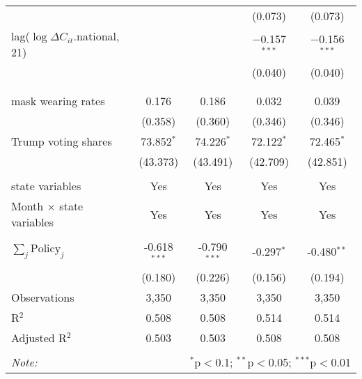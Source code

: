 \begin{tabular}{@{\extracolsep{1pt}}lcccc}
  &  &  & (0.073) & (0.073) \\ 
  lag($\log \Delta C_{it}$.national, 21) &  &  & $-$0.157$^{***}$ & $-$0.156$^{***}$ \\ 
  &  &  & (0.040) & (0.040) \\ 
   &  &  &  &  \\ 
  &  &  &  &  \\ 
  mask wearing rates & 0.176 & 0.186 & 0.032 & 0.039 \\ 
  & (0.358) & (0.360) & (0.346) & (0.346) \\ 
  Trump voting shares & 73.852$^{*}$ & 74.226$^{*}$ & 72.122$^{*}$ & 72.465$^{*}$ \\ 
  & (43.373) & (43.491) & (42.709) & (42.851) \\ 
 \hline \\[-1.8ex] 
state variables & Yes & Yes & Yes & Yes \\ 
Month $\times$ state variables & Yes & Yes & Yes & Yes \\ 
\hline \\[-1.8ex] 
$\sum_j \mathrm{Policy}_j$ & -0.618$^{***}$ & -0.790$^{***}$ & -0.297$^{*}$ & -0.480$^{**}$ \\ 
 & (0.180) & (0.226) & (0.156) & (0.194) \\ 
Observations & 3,350 & 3,350 & 3,350 & 3,350 \\ 
R$^{2}$ & 0.508 & 0.508 & 0.514 & 0.514 \\ 
Adjusted R$^{2}$ & 0.503 & 0.503 & 0.508 & 0.508 \\ 
\hline 
\hline \\[-1.8ex] 
\textit{Note:}  & \multicolumn{4}{r}{$^{*}$p$<$0.1; $^{**}$p$<$0.05; $^{***}$p$<$0.01} \\ 
\end{tabular} 